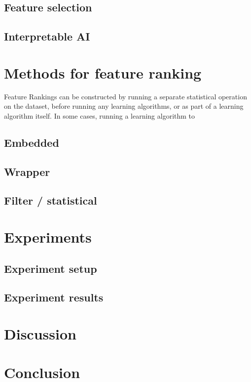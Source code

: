 \documentclass{article}
\begin{document}
    \subsection{Feature selection}
    \subsection{Interpretable AI}

\section{Methods for feature ranking}
Feature Rankings can be constructed by running a separate statistical operation on the dataset, before running any learning algorithms, or as part of a learning algorithm itself. In some cases, running a learning algorithm to 

    \subsection{Embedded}
    \subsection{Wrapper}
    \subsection{Filter / statistical}

\section{Experiments}
\subsection{Experiment setup}
\subsection{Experiment results}
\section{Discussion}
\section{Conclusion}
\citep{chen_kernel_2018}




\begin{appendices}

\end{appendices}
\end{document}
